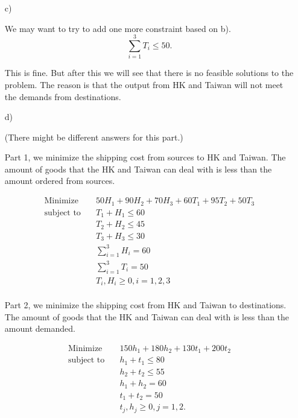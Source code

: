 \documentclass[12pt]{article}
\begin{document}
\begin{enumerate}
\item[c)]

We may want to try to add one more constraint based on b).
$$
\sum_{i = 1}^3 T_i \leqslant 50.
$$

This is fine. But after this we will see that there is no feasible solutions to the problem. The reason is that the output from HK and Taiwan will not meet the demands from destinations.



\item[d)]

(There might be different answers for this part.)

Part 1, we minimize the shipping cost from sources to HK and Taiwan. The amount of goods that the HK and Taiwan can deal with is less than the amount ordered from sources.

\begin{equation*}
\begin{aligned}
\text{Minimize} \quad & 50H_1 + 90 H_2 + 70H_3 + 60T_1 + 95T_2 + 50 T_3  \\
\text{subject\  to} \quad & T_1 + H_1 \leqslant 60 \\
& T_2 + H_2 \leqslant 45 \\
& T_3 + H_3 \leqslant 30 \\
& \sum_{i = 1}^3 H_i = 60 \\
& \sum_{i = 1}^3 T_i = 50 \\
& T_i, H_i \geqslant 0, i = 1, 2, 3 \\
\end{aligned}
\end{equation*}

Part 2, we minimize the shipping cost from HK and Taiwan to destinations. The amount of goods that the HK and Taiwan can deal with is less than the amount demanded.

\begin{equation*}
\begin{aligned}
\text{Minimize} \quad & 150h_1 + 180h_2 + 130t_1 + 200 t_2 \\
\text{subject\  to} \quad & h_1 + t_1 \leqslant 80 \\
& h_2 + t_2 \leqslant 55 \\
& h_1 + h_2 = 60 \\
& t_1 + t_2 = 50 \\
& t_j, h_j \geqslant 0, j = 1, 2.
\end{aligned}
\end{equation*}






\end{enumerate}
\end{document}
